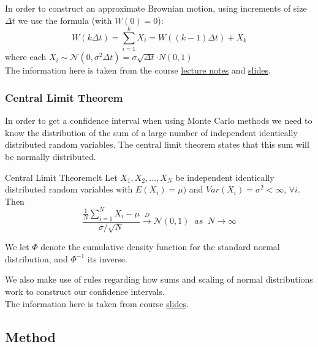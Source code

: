 In order to construct an approximate Brownian motion, using increments of size $\Delta t$ we use the formula (with $W(0) = 0$):
$$
W(k\Delta t) = \sum_{i=1}^k X_i = W((k-1)\Delta t) + X_k$$ 
where each $X_i \sim \mathcal{N}(0, \sigma^2\Delta t) = \sigma \sqrt{\Delta t} \mathcal \cdot  {N}(0, 1)$
\\

The information here is taken from the course \href{https://www.canvas.umu.se/courses/6705/files/1572963}{lecture notes} and \href{https://www.canvas.umu.se/courses/6705/files/1679497}{slides}.

\subsubsection{Central Limit Theorem}
\label{sec:clt}

In order to get a confidence interval when using Monte Carlo methods we need to know the distribution of the sum of a large number of independent identically distributed random variables. The central limit theorem states that this sum will be normally distributed.

\begin{theorem}{Central Limit Theorem}{clt}
Let $X_1, X_2, \dots, X_N$ be independent identically distributed random variables with $E(X_i) = \mu)$ and $Var(X_i) = \sigma^2 < \infty $, $\forall i$. Then
$$
    \frac{ \frac{1}{N} \sum^N_{i=1} X_i - \mu } {\sigma / \sqrt{N}} \xrightarrow{D} \mathcal{N}(0,1) \;\; as \;\; N \rightarrow \infty
$$
\end{theorem}
We let $\Phi$ denote the cumulative density function for the standard normal distribution, and $\Phi^{-1}$ its inverse.

We also make use of rules regarding how sums and scaling of normal distributions work to construct our confidence intervals.
\\

The information here is taken from course \href{https://www.canvas.umu.se/courses/6705/files/1636770}{slides}.

\subsection{Method}
\label{sec:method2}


